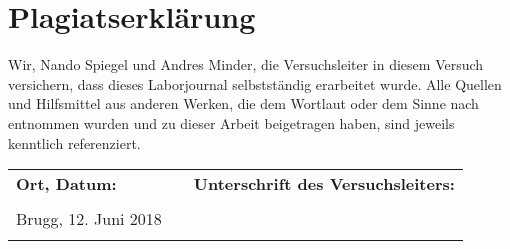 \chapter{Plagiatserklärung}
\thispagestyle{fancy}
Wir, Nando Spiegel und Andres Minder, die Versuchsleiter in diesem Versuch versichern, dass dieses Laborjournal selbstständig erarbeitet wurde. Alle Quellen und Hilfsmittel aus anderen Werken, die dem Wortlaut oder dem Sinne nach entnommen wurden und zu dieser Arbeit beigetragen haben, sind jeweils kenntlich referenziert.\\
\vfill
\begin{center}
\begin{tabular}{p{5cm}p{1cm}l}
\Large\textbf{Ort, Datum:} & & \Large\textbf{Unterschrift des Versuchsleiters:} \\
\vspace{1cm} & \vspace{1cm} & \vspace{1cm} \\
\centering\Large{Brugg, 12. Juni 2018} & & \\
\hrulefill & & \hrulefill 
\end{tabular}
\end{center}